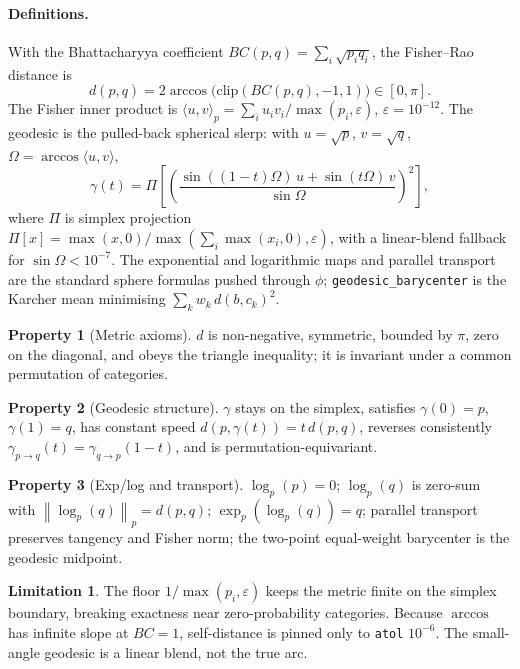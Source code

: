 \documentclass[11pt]{article}
\theoremstyle{definition}
\newtheorem{property}{Property}[section]
\newtheorem{limitation}{Limitation}[section]
\newcommand{\norm}[1]{\left\lVert #1 \right\rVert}
\newcommand{\code}[1]{\texttt{#1}}
\newcommand{\eps}{\varepsilon}
\begin{document}
\paragraph{Definitions.}
With the Bhattacharyya coefficient
$BC(p,q)=\sum_i\sqrt{p_iq_i}$, the Fisher--Rao distance is
\begin{equation}
d(p,q)=2\arccos\!\big(\mathrm{clip}(BC(p,q),-1,1)\big)\in[0,\pi].
\end{equation}
The Fisher inner product is $\langle u,v\rangle_p=\sum_i u_iv_i/\max(p_i,\eps)$,
$\eps=10^{-12}$. The geodesic is the pulled-back spherical slerp: with
$u=\sqrt p$, $v=\sqrt q$, $\Omega=\arccos\langle u,v\rangle$,
\begin{equation}
\gamma(t)=\Pi\!\left[\left(
\frac{\sin((1-t)\Omega)\,u+\sin(t\Omega)\,v}{\sin\Omega}\right)^{\!2}\right],
\end{equation}
where $\Pi$ is simplex projection
$\Pi[x]=\max(x,0)/\max(\sum_i\max(x_i,0),\eps)$, with a linear-blend
fallback for $\sin\Omega<10^{-7}$. The exponential and logarithmic maps and
parallel transport are the standard sphere formulas pushed through $\phi$;
\code{geodesic\_barycenter} is the Karcher mean minimising
$\sum_k w_k\,d(b,c_k)^2$.

\begin{property}[Metric axioms]
$d$ is non-negative, symmetric, bounded by $\pi$, zero on the diagonal, and
obeys the triangle inequality; it is invariant under a common permutation of
categories.
\end{property}

\begin{property}[Geodesic structure]
$\gamma$ stays on the simplex, satisfies $\gamma(0)=p$, $\gamma(1)=q$, has
constant speed $d(p,\gamma(t))=t\,d(p,q)$, reverses consistently
$\gamma_{p\to q}(t)=\gamma_{q\to p}(1-t)$, and is permutation-equivariant.
\end{property}

\begin{property}[Exp/log and transport]
$\log_p(p)=0$; $\log_p(q)$ is zero-sum with $\norm{\log_p(q)}_p=d(p,q)$;
$\exp_p(\log_p(q))=q$; parallel transport preserves tangency and Fisher
norm; the two-point equal-weight barycenter is the geodesic midpoint.
\end{property}

\begin{limitation}
The floor $1/\max(p_i,\eps)$ keeps the metric finite on the simplex
boundary, breaking exactness near zero-probability categories. Because
$\arccos$ has infinite slope at $BC=1$, self-distance is pinned only to
\code{atol} $10^{-6}$. The small-angle geodesic is a linear blend, not the
true arc.
\end{limitation}
\end{document}
